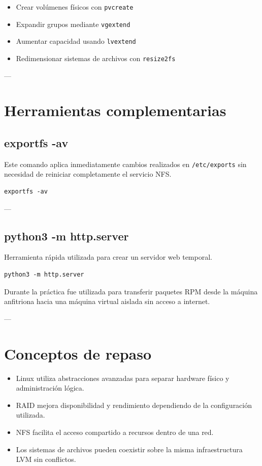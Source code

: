 \documentclass[11pt, letterpaper]{article}
\begin{document}
\begin{itemize}
\item Crear volúmenes físicos con \texttt{pvcreate}
\item Expandir grupos mediante \texttt{vgextend}
\item Aumentar capacidad usando \texttt{lvextend}
\item Redimensionar sistemas de archivos con \texttt{resize2fs}
\end{itemize}

---
\section{Herramientas complementarias}
\label{sec:orgd67b5cc}

\subsection{exportfs -av}
\label{sec:org00f2bf9}

Este comando aplica inmediatamente cambios realizados en \texttt{/etc/exports} sin necesidad de reiniciar completamente el servicio NFS.

\begin{verbatim}
exportfs -av
\end{verbatim}

---
\subsection{python3 -m http.server}
\label{sec:orgf8cf5c8}

Herramienta rápida utilizada para crear un servidor web temporal.

\begin{verbatim}
python3 -m http.server
\end{verbatim}

Durante la práctica fue utilizada para transferir paquetes RPM desde la máquina anfitriona hacia una máquina virtual aislada sin acceso a internet.

---
\section{Conceptos de repaso}
\label{sec:org32fcc7e}

\begin{itemize}
\item Linux utiliza abstracciones avanzadas para separar hardware físico y administración lógica.
\item RAID mejora disponibilidad y rendimiento dependiendo de la configuración utilizada.
\item NFS facilita el acceso compartido a recursos dentro de una red.
\item Los sistemas de archivos pueden coexistir sobre la misma infraestructura LVM sin conflictos.
\end{itemize}
\end{document}
